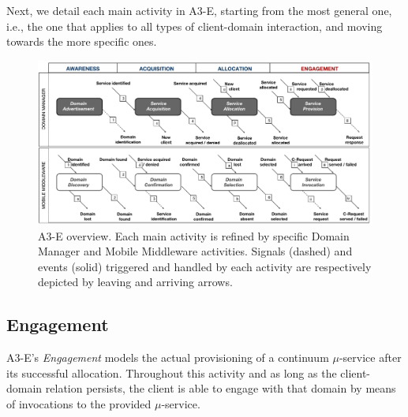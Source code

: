 Next, we detail each main activity in A3-E, starting from the most general one, i.e., the one that applies to all types of client-domain interaction, and moving towards the more specific ones.

\begin{figure}[tbp]
	\includegraphics[width=1\textwidth]{figs/A3-E-process}
	\caption{A3-E overview. Each main activity is refined by specific Domain Manager and Mobile Middleware activities. Signals (dashed) and events (solid) triggered and handled by each activity are respectively depicted by leaving and arriving arrows.}
	\label{fig:A3-E-process}
\end{figure}



\subsection{Engagement}\label{sec:A3-E-engagement}

A3-E's \textit{Engagement} models the actual provisioning of a continuum $\mu$-service after its successful allocation.
Throughout this activity and as long as the client-domain relation persists, the client is able to engage with that domain by means of invocations to the provided $\mu$-service. 

